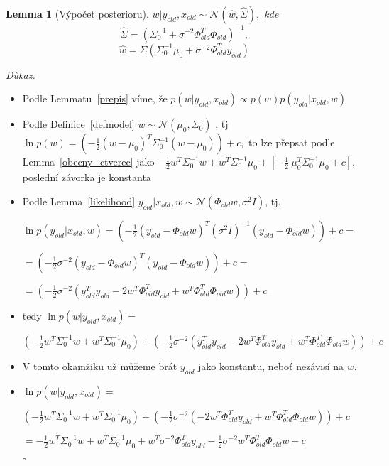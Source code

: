 \documentclass{article}
\newenvironment{pitemize}{
\begin{itemize}
  \setlength{\itemsep}{5pt}
  \setlength{\parskip}{0pt}
  \setlength{\parsep}{0pt}
}{\end{itemize}}
\newenvironment{pproof}{
\noindent\emph{Důkaz.}
\begin{pitemize}
}{\hfill$\square$\end{pitemize}}
\newcommand{\NN}{\mathcal{N}}
\newtheorem{lemma}{Lemma}
\theoremstyle{definition}
\begin{document}
\begin{lemma}[Výpočet posterioru]
\label{vypocet_posterior}
$w|y_{old},x_{old} \sim \NN(\hat{w},\hat{\Sigma}),$ kde $$\hat{\Sigma}=\left( \Sigma_0^{-1}+\sigma^{-2}\Phi_{old}^T \Phi_{old}\right)^{-1},$$ $$\hat{w}=\hat{\Sigma}\left(\Sigma_0^{-1} \mu_0+\sigma^{-2}\Phi_{old}^Ty_{old}\right)$$
\end{lemma}
\begin{pproof}
\item Podle Lemmatu~\ref{prepis} víme, že $p(w|y_{old},x_{old})\propto p(w)p(y_{old} | x_{old},w) $ 
\item Podle Definice~\ref{defmodel} $w\sim \NN(\mu_0,\Sigma_0)$ , tj $\ln p(w)= \left(-\frac{1}{2}
\left(w-\mu_0\right)^T
\Sigma_0^{-1} \left(w-\mu_0\right)\right)+c,$ to lze přepsat podle Lemma~\ref{obecny_ctverec} jako $-\frac{1}{2}w^T\Sigma_0^{-1}w + w^T\Sigma_0^{-1}\mu_0+\left[-\frac{1}{2}\
\mu_0^T\Sigma_0^{-1}\mu_0+c\right],$ poslední závorka je konstanta

\item Podle Lemma~\ref{likelihood} $y_{old}|x_{old},w\sim\NN(\Phi _{old}w,\sigma^2I)$, tj.

 $\ln p(y_{old}|x_{old},w)= \left(-\frac{1}{2}
\left(y_{old}-\Phi _{old}w\right)^T\left(
\sigma^{2}I\right)^{-1} \left(y_{old}-\Phi _{old}w\right)\right)+c=$

$=\left(-\frac{1}{2}\sigma^{-2}
\left(y_{old}-\Phi _{old}w\right)^T
 \left(y_{old}-\Phi _{old}w\right)\right)+c=$ 

$=\left(-\frac{1}{2}\sigma^{-2}
\left(y_{old}^Ty_{old}- 
2w^T\Phi _{old}^Ty_{old}+w^T\Phi _{old}^T\Phi _{old}w\right)\right)+c$

\item tedy $\ln p(w|y_{old},x_{old})=$

$\left(-\frac{1}{2}w^T\Sigma_0^{-1}w + w^T\Sigma_0^{-1}\mu_0\right) +\left(-\frac{1}{2}\sigma^{-2}
\left(y_{old}^Ty_{old}- 
2w^T\Phi _{old}^Ty_{old}+w^T\Phi _{old}^T\Phi _{old}w\right)\right)+c$

\item V tomto okamžiku už můžeme brát $y_{old}$ jako konstantu, neboť nezávisí na $w$. 

\item  $\ln p(w|y_{old},x_{old})=$

$\left(-\frac{1}{2}w^T\Sigma_0^{-1}w + w^T\Sigma_0^{-1}\mu_0\right) +\left(-\frac{1}{2}\sigma^{-2}
\left(- 
2w^T\Phi _{old}^Ty_{old}+w^T\Phi _{old}^T\Phi _{old}w\right)\right)+c$

$=-\frac{1}{2}w^T\Sigma_0^{-1}w + w^T\Sigma_0^{-1}\mu_0 +
w^T\sigma^{-2}\Phi _{old}^Ty_{old}-\frac{1}{2}\sigma^{-2}w^T\Phi _{old}^T\Phi _{old}w+c$


\end{pproof}
\end{document}
